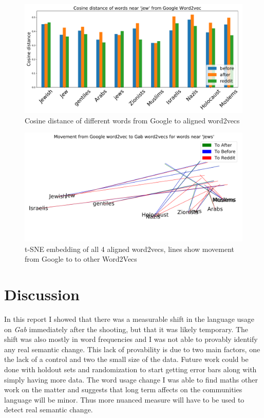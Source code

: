 \documentclass[letterpaper]{article}
\begin{document}
\begin{figure}[h!]
	\centering
	\includegraphics[width=1\textwidth]{sim_bars_jewish.pdf}
	\caption{Cosine distance of different words from Google to aligned word2vecs}\label{dist2}
\end{figure}

\begin{figure}[h!]
	\centering
	\includegraphics[width=1\textwidth]{tsen_jewish_arrows.pdf}
	\caption{t-SNE embedding of all 4 aligned word2vecs, lines show movement from Google to to other Word2Vecs}\label{tsne}
\end{figure}


\section{Discussion}

In this report I showed that there was a measurable shift in the language usage on \textit{Gab} immediately after the shooting, but that it was likely temporary. The shift was also mostly in word frequencies and I was not able to provably identify any real semantic change. This lack of provability is due to two main factors, one the lack of a control and two the small size of the data. Future work could be done with holdout sets and randomization to start getting error bars along with simply having more data. The word usage change I was able to find maths other work \cite{finkelstein2018quantitative} on the matter and suggests that long term affects on the communities language will be minor. Thus more nuanced measure will have to be used to detect real semantic change.
\end{document}
